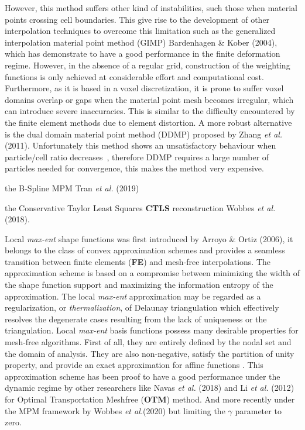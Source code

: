 However, this method suffers other kind of instabilities, such those
when material points crossing cell boundaries. This give rise to the
development of other interpolation techniques to overcome this
limitation such as the generalized interpolation material point method
(GIMP) Bardenhagen \& Kober (2004)\cite{Bardenhagen2004}, which has
demonstrate to have a good performance in the finite deformation
regime. However, in the absence of a regular grid, construction of the
weighting functions is only achieved at considerable effort and
computational cost. Furthermore, as it is based in a voxel
discretization, it is prone to suffer voxel domains overlap or gaps when the
material point mesh becomes irregular, which can introduce severe
inaccuracies. This is similar to the difficulty encountered by the
finite element methods due to element distortion.
A more robust alternative is the dual domain material point method
(DDMP) proposed by Zhang {\it et al.}
(2011)\cite{Zhang2011a}. Unfortunately this method shows an
unsatisfactory behaviour when particle/cell ratio
decreases~\cite{DHAKAL2016301}, therefore DDMP requires a large number
of particles needed for convergence, this
makes the method very expensive.  

the B-Spline MPM
Tran {\it et al.} (2019)\cite{Tran2019a}


the Conservative Taylor Least Squares \textbf{CTLS} reconstruction Wobbes {\it et al.}
(2018)\cite{E_Wobbes_2018}.


Local \textit{max-ent} shape functions was first introduced by Arroyo \& Ortiz (2006)\cite{Arroyo2006}, it belongs to the class of convex 
approximation schemes and provides a seamless transition between
finite elements (\textbf{FE}) and mesh-free interpolations. The
approximation scheme is based on a compromise between minimizing the
width of the shape function support and maximizing the information
entropy of the approximation. The local \textit{max-ent} approximation
may be regarded as a regularization, or \textit{thermalization}, of
Delaunay triangulation which effectively resolves the degenerate cases
resulting from the lack of uniqueness or the triangulation. Local
\textit{max-ent} basis functions possess many desirable properties for
mesh-free algorithms. First of all, they are entirely defined by the
nodal set and the domain of analysis. They are also non-negative,
satisfy the partition of unity property, and provide an exact
approximation for affine functions \cite{Arroyo2006}. This
approximation scheme has been proof to have a good performance under
the dynamic regime by other researchers like Navas {\it et al.}
(2018)\cite{Navas2018a} and Li {\it et al.} (2012)\cite{Li2012} for
Optimal Transportation Meshfree (\textbf{OTM}) method. And more
recently under the MPM framework by Wobbes {\it et
  al.}(2020)\cite{Wobbes2020} but limiting the $\gamma$ parameter to
zero.

